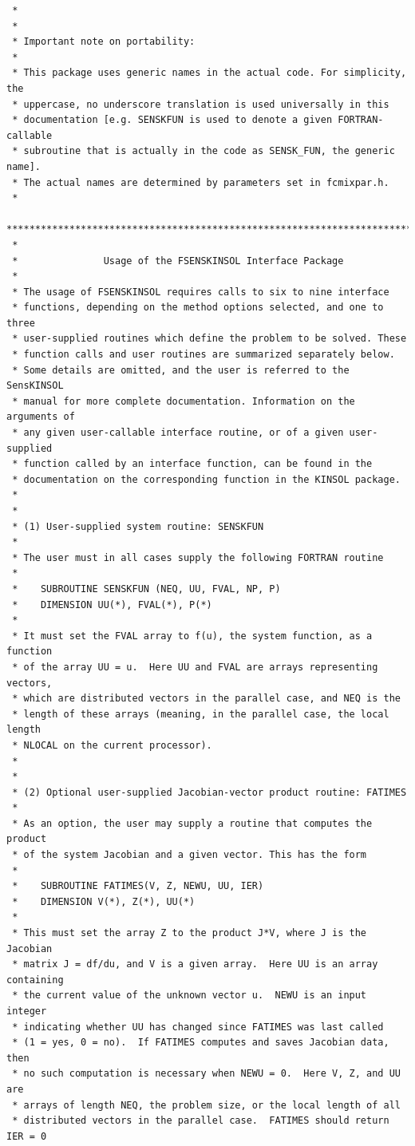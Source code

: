 \documentclass[11pt]{article}
\begin{document}
\begin{verbatim}
 *
 *
 * Important note on portability:
 *
 * This package uses generic names in the actual code. For simplicity, the
 * uppercase, no underscore translation is used universally in this
 * documentation [e.g. SENSKFUN is used to denote a given FORTRAN-callable
 * subroutine that is actually in the code as SENSK_FUN, the generic name].
 * The actual names are determined by parameters set in fcmixpar.h.
 *
 ***************************************************************************
 *
 *               Usage of the FSENSKINSOL Interface Package
 *
 * The usage of FSENSKINSOL requires calls to six to nine interface
 * functions, depending on the method options selected, and one to three
 * user-supplied routines which define the problem to be solved. These
 * function calls and user routines are summarized separately below.
 * Some details are omitted, and the user is referred to the SensKINSOL
 * manual for more complete documentation. Information on the arguments of
 * any given user-callable interface routine, or of a given user-supplied
 * function called by an interface function, can be found in the
 * documentation on the corresponding function in the KINSOL package.
 *
 *
 * (1) User-supplied system routine: SENSKFUN
 *
 * The user must in all cases supply the following FORTRAN routine
 *
 *    SUBROUTINE SENSKFUN (NEQ, UU, FVAL, NP, P)
 *    DIMENSION UU(*), FVAL(*), P(*)
 *
 * It must set the FVAL array to f(u), the system function, as a function
 * of the array UU = u.  Here UU and FVAL are arrays representing vectors,
 * which are distributed vectors in the parallel case, and NEQ is the
 * length of these arrays (meaning, in the parallel case, the local length
 * NLOCAL on the current processor).
 *
 *
 * (2) Optional user-supplied Jacobian-vector product routine: FATIMES
 *
 * As an option, the user may supply a routine that computes the product
 * of the system Jacobian and a given vector. This has the form
 *
 *    SUBROUTINE FATIMES(V, Z, NEWU, UU, IER)
 *    DIMENSION V(*), Z(*), UU(*)
 *
 * This must set the array Z to the product J*V, where J is the Jacobian
 * matrix J = df/du, and V is a given array.  Here UU is an array containing
 * the current value of the unknown vector u.  NEWU is an input integer
 * indicating whether UU has changed since FATIMES was last called
 * (1 = yes, 0 = no).  If FATIMES computes and saves Jacobian data, then
 * no such computation is necessary when NEWU = 0.  Here V, Z, and UU are
 * arrays of length NEQ, the problem size, or the local length of all
 * distributed vectors in the parallel case.  FATIMES should return IER = 0

\end{verbatim}
\end{document}
